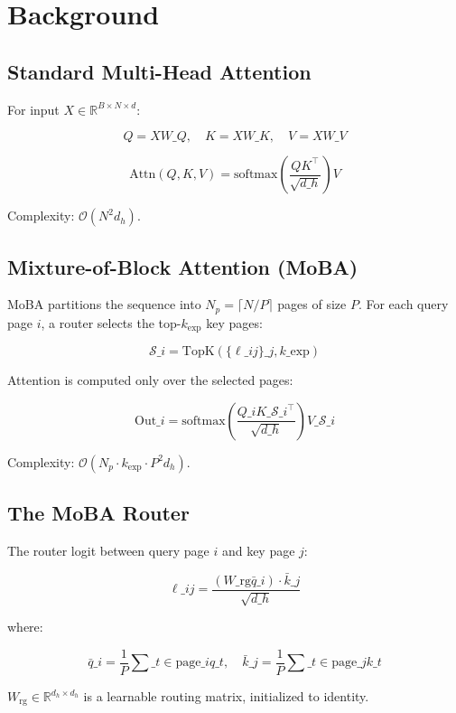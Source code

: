 \section{Background}

\subsection{Standard Multi-Head Attention}

For input $X \in \mathbb{R}^{B \times N \times d}$:

\[
Q = X W\_Q, \quad K = X W\_K, \quad V = X W\_V
\tag{3.1}
\]

\[
\text{Attn}(Q, K, V) = \text{softmax}\!\left(\frac{Q K^\top}{\sqrt{d\_h}}\right) V
\tag{3.2}
\]

Complexity: $\mathcal{O}(N^2 d_h)$.

\subsection{Mixture-of-Block Attention (MoBA)}

MoBA partitions the sequence into $N_p = \lceil N / P \rceil$ pages of 
size $P$. For each query page $i$, a router selects the top-$k_\text{exp}$ 
key pages:

\[
\mathcal{S}\_i = \text{TopK}(\{\ell\_{ij}\}\_j, k\_\text{exp})
\tag{3.3}
\]

Attention is computed only over the selected pages:

\[
\text{Out}\_i = \text{softmax}\!\left(\frac{Q\_i K\_{\mathcal{S}\_i}^\top}{\sqrt{d\_h}}\right) V\_{\mathcal{S}\_i}
\tag{3.4}
\]

Complexity: $\mathcal{O}(N_p \cdot k_\text{exp} \cdot P^2 d_h)$.

\subsection{The MoBA Router}

The router logit between query page $i$ and key page $j$:

\[
\ell\_{ij} = \frac{(W\_\text{rg} \bar{q}\_i) \cdot \bar{k}\_j}{\sqrt{d\_h}}
\tag{3.5}
\]

where:

\[
\bar{q}\_i = \frac{1}{P} \sum\_{t \in \text{page}\_i} q\_t, \quad
\bar{k}\_j = \frac{1}{P} \sum\_{t \in \text{page}\_j} k\_t
\tag{3.6}
\]

$W_\text{rg} \in \mathbb{R}^{d_h \times d_h}$ is a learnable routing matrix, 
initialized to identity.

